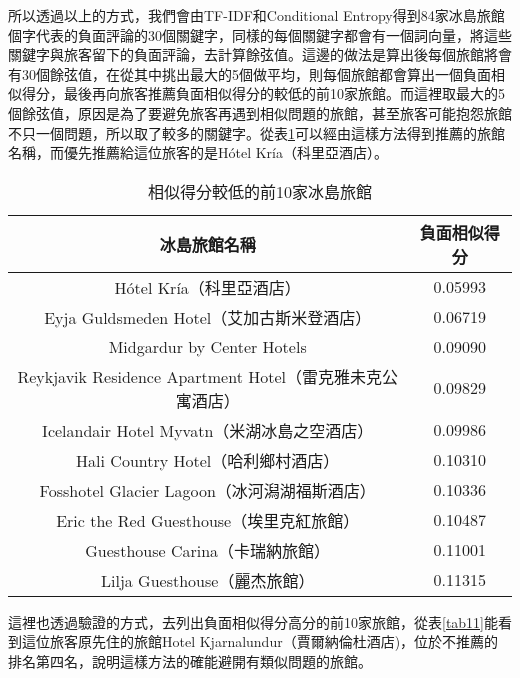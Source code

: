 	所以透過以上的方式，我們會由TF-IDF和Conditional Entropy得到84家冰島旅館個字代表的負面評論的30個關鍵字，同樣的每個關鍵字都會有一個詞向量，將這些關鍵字與旅客留下的負面評論，去計算餘弦值。這邊的做法是算出後每個旅館將會有30個餘弦值，在從其中挑出最大的5個做平均，則每個旅館都會算出一個負面相似得分，最後再向旅客推薦負面相似得分的較低的前10家旅館。而這裡取最大的5個餘弦值，原因是為了要避免旅客再遇到相似問題的旅館，甚至旅客可能抱怨旅館不只一個問題，所以取了較多的關鍵字。從表\ref{tab10}可以經由這樣方法得到推薦的旅館名稱，而優先推薦給這位旅客的是Hótel Kría（科里亞酒店）。\\
	
	\begin{table}[H]
	\centering
	\caption{相似得分較低的前10家冰島旅館}
	\begin{tabular}{|c|c|}
	\toprule
	冰島旅館名稱 & 負面相似得分 \\
	\midrule
	Hótel Kría（科里亞酒店） & 0.05993  \\
	\midrule
	Eyja Guldsmeden Hotel（艾加古斯米登酒店） & 0.06719 \\
	\midrule
	Midgardur by Center Hotels & 0.09090  \\
	\midrule
	Reykjavik Residence Apartment Hotel（雷克雅未克公寓酒店） & 0.09829 \\
	\midrule
	Icelandair Hotel Myvatn（米湖冰島之空酒店） & 0.09986\\
	\midrule
	Hali Country Hotel（哈利鄉村酒店） &  0.10310 \\
	\midrule
	Fosshotel Glacier Lagoon（冰河潟湖福斯酒店） & 0.10336 \\
	\midrule
	Eric the Red Guesthouse（埃里克紅旅館） & 0.10487 \\
	\midrule
	Guesthouse Carina（卡瑞納旅館） & 0.11001 \\
	\midrule
	Lilja Guesthouse（麗杰旅館） & 0.11315 \\
	\bottomrule
	\end{tabular}
	\label{tab10}
	\end{table}
	
\noindent 這裡也透過驗證的方式，去列出負面相似得分高分的前10家旅館，從表\ref{tab11}能看到這位旅客原先住的旅館Hotel Kjarnalundur（賈爾納倫杜酒店)，位於不推薦的排名第四名，說明這樣方法的確能避開有類似問題的旅館。\\

